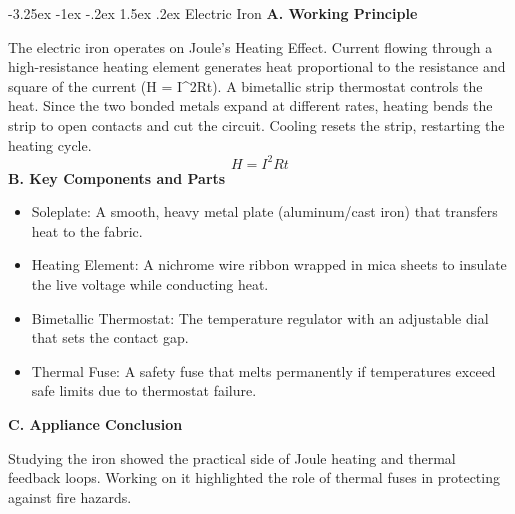 \documentclass[11pt,a4paper]{report}
\makeatletter
\renewcommand{\section}{\@startsection{section}{1}{\z@}%
  {-3.25ex \@plus -1ex \@minus -.2ex}%
  {1.5ex \@plus.2ex}%
  {\normalfont\Large\bfseries\color{primaryColor}}}
\makeatother
\begin{document}
\section{Electric Iron}
\noindent\textbf{A. Working Principle}\par\medskip
The electric iron operates on Joule's Heating Effect. Current flowing through a high-resistance heating element generates heat proportional to the resistance and square of the current (H = I\textasciicircum{}2Rt). A bimetallic strip thermostat controls the heat. Since the two bonded metals expand at different rates, heating bends the strip to open contacts and cut the circuit. Cooling resets the strip, restarting the heating cycle.
\begin{equation}H = I^2 R t\end{equation}
\noindent\textbf{B. Key Components and Parts}\par\medskip
\begin{itemize}
  \item Soleplate: A smooth, heavy metal plate (aluminum/cast iron) that transfers heat to the fabric.
  \item Heating Element: A nichrome wire ribbon wrapped in mica sheets to insulate the live voltage while conducting heat.
  \item Bimetallic Thermostat: The temperature regulator with an adjustable dial that sets the contact gap.
  \item Thermal Fuse: A safety fuse that melts permanently if temperatures exceed safe limits due to thermostat failure.
\end{itemize}
\noindent\textbf{C. Appliance Conclusion}\par\medskip
Studying the iron showed the practical side of Joule heating and thermal feedback loops. Working on it highlighted the role of thermal fuses in protecting against fire hazards.
\end{document}
